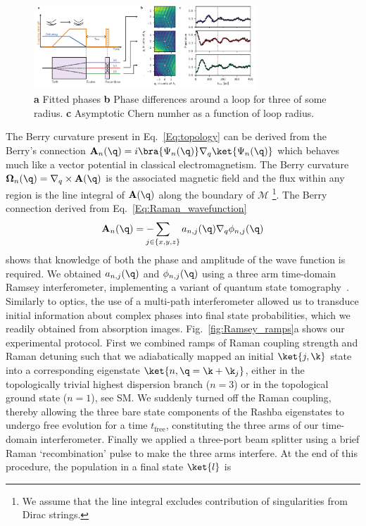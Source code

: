 %
\begin{figure}[htb]
\begin{center}
\includegraphics[width=3.3in]{Figures/Chapter7/Fig4.pdf}
\caption{{\bfseries a} Fitted phases {\bfseries b} Phase differences around a loop for three of some radius. {\bfseries c} Asymptotic Chern numher as a function of loop radius.}
\label{fig:Ramsey_phases}
\end{center}
\end{figure}
The Berry curvature present in Eq.~\ref{Eq:topology} can be derived from the Berry's connection $\mathbf{A}_n(\q)=i\bra{\Psi_n(\q)}\mathbf{\nabla}_q\ket{\Psi_n(\q)}$ which behaves much like a vector potential in classical electromagnetism. The Berry curvature $\mathbf{\Omega}_n(\q)=\mathbf{\nabla}_q\times\mathbf{A}(\q)$ is the associated magnetic field and the flux within any region is the line integral of $\mathbf{A(\q)}$ along the boundary of $\mathcal{M}$ \footnote{We assume that the line integral excludes contribution of singularities from Dirac strings.}. The Berry connection derived from Eq.~\ref{Eq:Raman_wavefunction}
%
\begin{equation}
 \mathbf A_n(\q)= -\!\!\!\!\!\!\sum_{j \in\{x, y, z\}}  a_{n,j}(\q)  \nabla_q \phi_{n,j}(\q)
\label{Eq:Berry_connection1}
\end{equation}
%
shows that knowledge of both the phase and amplitude of the wave function is required. We obtained $a_{n,j}(\q)$ and $\phi_{n,j}(\q)$ using a three arm time-domain Ramsey interferometer, implementing a variant of quantum state tomography~\cite{flaschner_experimental_2016,godfrin_generalized_2018}. Similarly to optics, the use of a multi-path interferometer allowed us to transduce initial information about complex phases into final state probabilities, which we readily obtained from absorption images. Fig.~\ref{fig:Ramsey_ramps}a shows our experimental protocol. First we combined ramps of Raman coupling strength and Raman detuning such that we adiabatically mapped an initial $\ket{j, \k}$ state into a corresponding eigenstate $\ket{n,\q=\k+\k_j}$, either in the topologically trivial highest dispersion branch ($n=3$) or in the topological ground state ($n=1$), see SM. We suddenly turned off the Raman coupling, thereby allowing the three bare state components of the Rashba eigenstates to undergo free evolution for a time $t_{\mathrm{free}}$, constituting the three arms of our time-domain interferometer. Finally we applied a three-port beam splitter using a brief Raman `recombination’ pulse to make the three arms interfere. At the end of this procedure, the population in a final state $\ket{l}$ is
